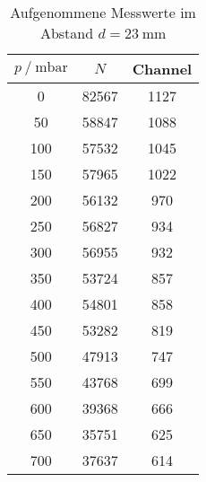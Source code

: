 \begin{table}[H]
   \centering
   \caption{Aufgenommene Messwerte im Abstand $d = \SI{23}{\mm}$ }
   \label{tab:reich23mm}
   \begin{tabular} { c c c }
 \toprule
 {$p\:/\: \mathrm{mbar}$} & {$N$} & {Channel} \\
    \midrule
    0 & 82567 & 1127 \\
    50 & 58847 & 1088 \\
    100 & 57532 & 1045 \\
    150 & 57965 & 1022 \\
    200 & 56132 & 970 \\
    250 & 56827 & 934 \\
    300 & 56955 & 932 \\
    350 & 53724 & 857 \\
    400 & 54801 & 858 \\
    450 & 53282 & 819 \\
    500 & 47913 & 747 \\
    550 & 43768 & 699 \\
    600 & 39368 & 666 \\
    650 & 35751 & 625 \\
    700 & 37637 & 614 \\
    \bottomrule
  \end{tabular}
\end{table}
